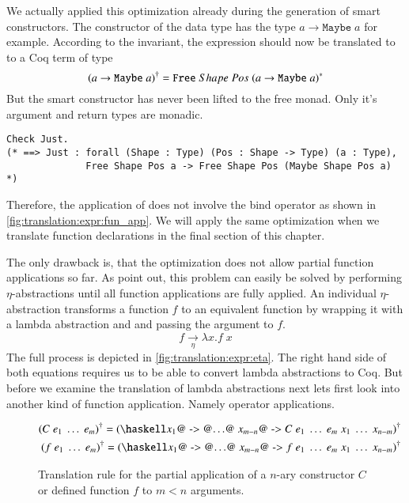 We actually applied this optimization already during the generation of smart constructors.
The constructor  of the  data type has the type $a \rightarrow \texttt{Maybe}\;a$ for example.
According to the invariant, the expression  should now be translated to to a Coq term of type
\[
  {(a \rightarrow \texttt{Maybe}\;a)}^{\dagger}
    = {\texttt{Free}}\;Shape\;Pos\;{{(a \rightarrow \texttt{Maybe}\;a)}^{*}}
\]
But the smart constructor  has never been lifted to the free monad.
Only it's argument and return types are monadic.
\begin{verbatim}
Check Just.
(* ==> Just : forall (Shape : Type) (Pos : Shape -> Type) (a : Type),
              Free Shape Pos a -> Free Shape Pos (Maybe Shape Pos a) *)
\end{verbatim}
Therefore, the application of  does not involve the bind operator as shown in \autoref{fig:translation:expr:fun_app}.
We will apply the same optimization when we translate function declarations in the final section of this chapter.

The only drawback is, that the optimization does not allow partial function applications so far.
As \cite{Abel:2005} point out, this problem can easily be solved by performing $\eta$-abstractions until all function applications are fully applied.
An individual $\eta$-abstraction transforms a function $f$ to an equivalent function by wrapping it with a lambda abstraction and and passing the argument to $f$.
\[
  f \xrightarrow[\eta]{} \lambda x. f\;x
\]
The full process is depicted in \autoref{fig:translation:expr:eta}.
The right hand side of both equations requires us to be able to convert lambda abstractions to Coq.
But before we examine the translation of lambda abstractions next lets first look into another kind of function application.
Namely operator applications.
\begin{figure}[H]
  \begin{align*}
    \toCoq{(C\;e_1\;\ldots\;e_m)} = \toCoq{(\haskellM{\@$x_1$@ -> @$\ldots$@ \@$x_{m - n}$@ ->}\; C\;e_1\;\ldots\;e_m\;x_1\;\ldots\;x_{n - m})} \\
    \toCoq{(f\;e_1\;\ldots\;e_m)} = \toCoq{(\haskellM{\@$x_1$@ -> @$\ldots$@ \@$x_{m - n}$@ ->}\; f\;e_1\;\ldots\;e_m\;x_1\;\ldots\;x_{n - m})}
  \end{align*}
  \caption{Translation rule for the partial application of a $n$-ary constructor $C$ or defined function $f$ to $m < n$ arguments.}
  \label{fig:translation:expr:eta}
\end{figure}

